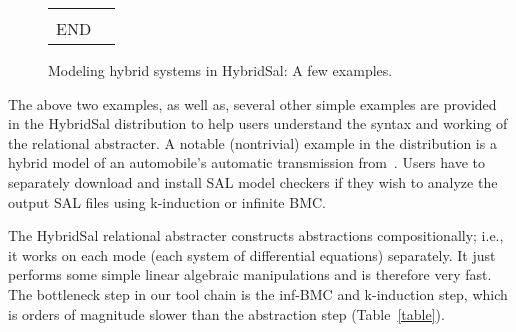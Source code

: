 \documentclass{llncs}
\begin{document}
\begin{figure}[htb!]
\begin{tt}
\begin{tabular}{ll}
\begin{minipage}{2in}
\begin{tabbing}
%
%
\\
END
\end{tabbing}
\end{minipage}
\end{tabular}
\end{tt}
\caption{Modeling hybrid systems in HybridSal: A few examples.}
\label{fig:ex}
\end{figure}

The above two examples, as well as,
several other simple examples are provided in the
HybridSal distribution to help
users understand the syntax and working of the
relational abstracter.  
A notable (nontrivial) example in the distribution is a hybrid
model of an automobile's automatic transmission from~\cite{ChutinanButts02:Mobies}.
Users have to separately
download and install SAL model checkers if they
wish to analyze the output SAL files using
k-induction or infinite BMC.

The HybridSal relational abstracter constructs abstractions
compositionally; i.e., it works on each mode 
(each system of differential equations) separately.
It just performs some simple linear algebraic manipulations
and is therefore very fast.  
The bottleneck step in our tool chain
is the inf-BMC and k-induction step,
which is orders of magnitude slower than the abstraction step
(Table~\ref{table}).
\end{document}
